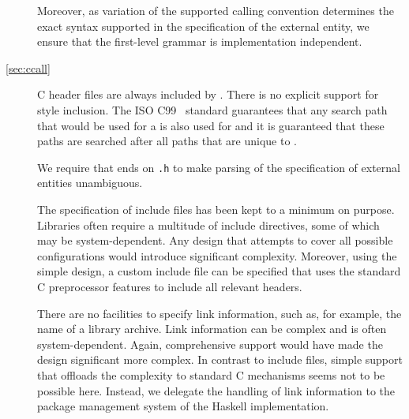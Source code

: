 \documentclass[a4paper,twosides]{article}
\newcommand{\code}[1]{\texttt{#1}}
\begin{document}
\begin{description}
  Moreover, as variation of the supported calling convention determines the
  exact syntax supported in the specification of the external entity, we
  ensure that the first-level grammar is implementation independent.
\item[\ref{sec:ccall}] C header files are always included by .  There is no explicit support for  style inclusion.  The ISO C99~\cite{C99} standard
  guarantees that any search path that would be used for a  is also used for  and
  it is guaranteed that these paths are searched after all paths that are
  unique to .
  
  We require that  ends on \code{.h} to make parsing of the
  specification of external entities unambiguous.

  The specification of include files has been kept to a
  minimum on purpose.  Libraries often require a multitude of include
  directives, some of which may be system-dependent.  Any design that attempts
  to cover all possible configurations would introduce significant complexity.
  Moreover, using the simple design, a custom include file can be specified
  that uses the standard C preprocessor features to include all relevant
  headers.
  
  There are no facilities to specify link information, such as, for example,
  the name of a library archive.  Link information can be complex and is often
  system-dependent.  Again, comprehensive support would have made the design
  significant more complex.  In contrast to include files, simple support that
  offloads the complexity to standard C mechanisms seems not to be possible
  here.  Instead, we delegate the handling of link information to the package
  management system of the Haskell implementation.
\end{description}




\end{document}

